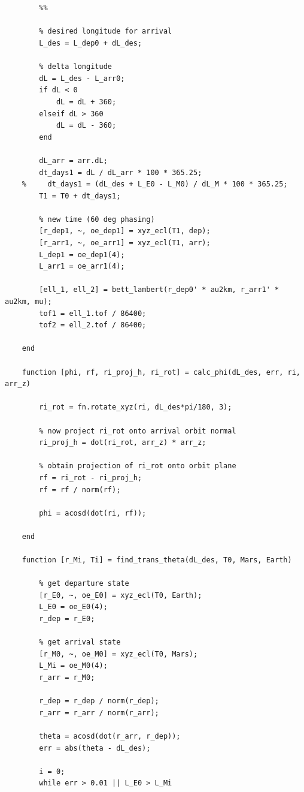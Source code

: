 \documentclass[conf]{new-aiaa}
\begin{document}
\begin{lstlisting}
    
        
        %% 
        
        % desired longitude for arrival 
        L_des = L_dep0 + dL_des;     
        
        % delta longitude 
        dL = L_des - L_arr0; 
        if dL < 0 
            dL = dL + 360; 
        elseif dL > 360 
            dL = dL - 360; 
        end
        
        dL_arr = arr.dL;
        dt_days1 = dL / dL_arr * 100 * 365.25; 
    %     dt_days1 = (dL_des + L_E0 - L_M0) / dL_M * 100 * 365.25; 
        T1 = T0 + dt_days1; 
    
        % new time (60 deg phasing) 
        [r_dep1, ~, oe_dep1] = xyz_ecl(T1, dep); 
        [r_arr1, ~, oe_arr1] = xyz_ecl(T1, arr); 
        L_dep1 = oe_dep1(4); 
        L_arr1 = oe_arr1(4); 
    
        [ell_1, ell_2] = bett_lambert(r_dep0' * au2km, r_arr1' * au2km, mu); 
        tof1 = ell_1.tof / 86400; 
        tof2 = ell_2.tof / 86400; 
    
    end 
    
    function [phi, rf, ri_proj_h, ri_rot] = calc_phi(dL_des, err, ri, arr_z)
    
        ri_rot = fn.rotate_xyz(ri, dL_des*pi/180, 3); 
    
        % now project ri_rot onto arrival orbit normal  
        ri_proj_h = dot(ri_rot, arr_z) * arr_z; 
    
        % obtain projection of ri_rot onto orbit plane 
        rf = ri_rot - ri_proj_h; 
        rf = rf / norm(rf); 
    
        phi = acosd(dot(ri, rf)); 
    
    end 
    
    function [r_Mi, Ti] = find_trans_theta(dL_des, T0, Mars, Earth)
        
        % get departure state 
        [r_E0, ~, oe_E0] = xyz_ecl(T0, Earth); 
        L_E0 = oe_E0(4); 
        r_dep = r_E0; 
    
        % get arrival state 
        [r_M0, ~, oe_M0] = xyz_ecl(T0, Mars); 
        L_Mi = oe_M0(4); 
        r_arr = r_M0; 
        
        r_dep = r_dep / norm(r_dep); 
        r_arr = r_arr / norm(r_arr); 
    
        theta = acosd(dot(r_arr, r_dep)); 
        err = abs(theta - dL_des); 
    
        i = 0; 
        while err > 0.01 || L_E0 > L_Mi  
    

\end{lstlisting}
\end{document}
